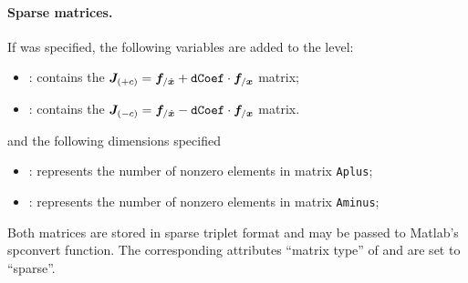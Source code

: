 \paragraph{Sparse matrices.}
If  was specified, the following variables are added to the
 level:
\begin{itemize}
\item {} : contains the 
    $\boldsymbol{J}_{(+c)} = \boldsymbol{f}_{/\dot{\boldsymbol{x}}} + \texttt{dCoef} \cdot \boldsymbol{f}_{/\boldsymbol{x}}$ 
    matrix;
\item {} : contains the
    $\boldsymbol{J}_{(-c)} = \boldsymbol{f}_{/\dot{\boldsymbol{x}}} - \texttt{dCoef} \cdot \boldsymbol{f}_{/\boldsymbol{x}}$ 
    matrix.
\end{itemize}
and the following dimensions specified
\begin{itemize}
\item {} : 
    represents the number of nonzero elements in matrix \texttt{Aplus};
\item {} : 
    represents the number of nonzero elements in matrix \texttt{Aminus};
\end{itemize}
Both matrices are stored in sparse triplet format and may be passed to Matlab's spconvert function.
The corresponding attributes ``matrix type'' of  and  are set to ``sparse''.

